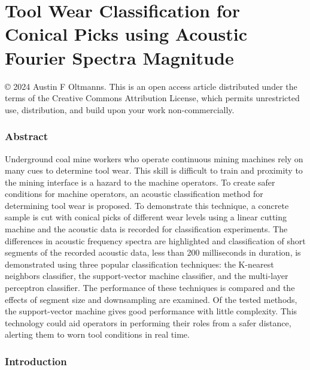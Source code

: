 
\chapter{Tool Wear Classification for Conical Picks
using Acoustic Fourier Spectra Magnitude \label{chap:P2}}

\begin{center}
© 2024 Austin F Oltmanns. 
This is an open access article distributed under the terms of the Creative Commons Attribution License,
which permits unrestricted use, distribution, and build upon your work non-commercially.
\end{center}

\subsection{Abstract}

Underground coal mine workers who operate continuous mining machines rely on many cues to determine tool wear. 
This skill is difficult to train and proximity to the mining interface is a hazard to the machine operators. 
To create safer conditions for machine operators, an acoustic classification method for determining tool wear is proposed. 
To demonstrate this technique, a concrete sample is cut with conical picks of different wear levels 
using a linear cutting machine and the acoustic data is recorded for classification experiments. 
The differences in acoustic frequency spectra are highlighted and classification of short segments 
of the recorded acoustic data, less than 200 milliseconds in duration, is demonstrated using 
three popular classification techniques: the K-nearest neighbors classifier, the support-vector machine classifier, 
and the multi-layer perceptron classifier. The performance of these techniques is compared and 
the effects of segment size and downsampling are examined. Of the tested methods, the support-vector machine 
gives good performance with little complexity. This technology could aid operators in performing their 
roles from a safer distance, alerting them to worn tool conditions in real time.


\subsection{Introduction}\label{sec1}

